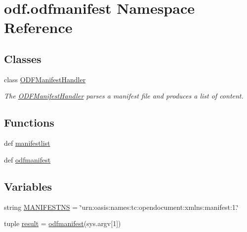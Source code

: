 \hypertarget{namespaceodf_1_1odfmanifest}{\section{odf.\+odfmanifest Namespace Reference}
\label{namespaceodf_1_1odfmanifest}
}
\subsection*{Classes}
\begin{DoxyCompactItemize}
\item 
class \hyperlink{classodf_1_1odfmanifest_1_1ODFManifestHandler}{O\+D\+F\+Manifest\+Handler}
\begin{DoxyCompactList}\small\item\em The \hyperlink{classodf_1_1odfmanifest_1_1ODFManifestHandler}{O\+D\+F\+Manifest\+Handler} parses a manifest file and produces a list of content. \end{DoxyCompactList}\end{DoxyCompactItemize}
\subsection*{Functions}
\begin{DoxyCompactItemize}
\item 
def \hyperlink{namespaceodf_1_1odfmanifest_aa30e4aac456f93d3a2ec1d6eafd77004}{manifestlist}
\item 
def \hyperlink{namespaceodf_1_1odfmanifest_a69af946eb54c4a75e75cef5611d6fcef}{odfmanifest}
\end{DoxyCompactItemize}
\subsection*{Variables}
\begin{DoxyCompactItemize}
\item 
string \hyperlink{namespaceodf_1_1odfmanifest_a66286c05d5031965957b26b57b7bbfbd}{M\+A\+N\+I\+F\+E\+S\+T\+N\+S} = \char`\"{}urn\+:oasis\+:names\+:tc\+:opendocument\+:xmlns\+:manifest\+:1.\char`\"{}
\item 
tuple \hyperlink{namespaceodf_1_1odfmanifest_a1641ce31eefa41ae260f4bd5785b37b3}{result} = \hyperlink{namespaceodf_1_1odfmanifest_a69af946eb54c4a75e75cef5611d6fcef}{odfmanifest}(sys.\+argv\mbox{[}1\mbox{]})
\end{DoxyCompactItemize}


